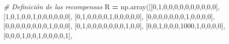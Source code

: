 \documentclass[]{book}
\newenvironment{Shaded}{\begin{snugshade}}{\end{snugshade}}
\newcommand{\CommentTok}[1]{\textcolor[rgb]{0.56,0.35,0.01}{\textit{#1}}}
\newcommand{\DecValTok}[1]{\textcolor[rgb]{0.00,0.00,0.81}{#1}}
\newcommand{\NormalTok}[1]{#1}
\newcommand{\OperatorTok}[1]{\textcolor[rgb]{0.81,0.36,0.00}{\textbf{#1}}}
\begin{document}
\begin{Shaded}
\begin{Highlighting}[]
\CommentTok{# Definición de las recompensas}
\NormalTok{R }\OperatorTok{=}\NormalTok{ np.array([[}\DecValTok{0}\NormalTok{,}\DecValTok{1}\NormalTok{,}\DecValTok{0}\NormalTok{,}\DecValTok{0}\NormalTok{,}\DecValTok{0}\NormalTok{,}\DecValTok{0}\NormalTok{,}\DecValTok{0}\NormalTok{,}\DecValTok{0}\NormalTok{,}\DecValTok{0}\NormalTok{,}\DecValTok{0}\NormalTok{,}\DecValTok{0}\NormalTok{,}\DecValTok{0}\NormalTok{],}
\NormalTok{              [}\DecValTok{1}\NormalTok{,}\DecValTok{0}\NormalTok{,}\DecValTok{1}\NormalTok{,}\DecValTok{0}\NormalTok{,}\DecValTok{0}\NormalTok{,}\DecValTok{1}\NormalTok{,}\DecValTok{0}\NormalTok{,}\DecValTok{0}\NormalTok{,}\DecValTok{0}\NormalTok{,}\DecValTok{0}\NormalTok{,}\DecValTok{0}\NormalTok{,}\DecValTok{0}\NormalTok{],}
\NormalTok{              [}\DecValTok{0}\NormalTok{,}\DecValTok{1}\NormalTok{,}\DecValTok{0}\NormalTok{,}\DecValTok{0}\NormalTok{,}\DecValTok{0}\NormalTok{,}\DecValTok{0}\NormalTok{,}\DecValTok{1}\NormalTok{,}\DecValTok{0}\NormalTok{,}\DecValTok{0}\NormalTok{,}\DecValTok{0}\NormalTok{,}\DecValTok{0}\NormalTok{,}\DecValTok{0}\NormalTok{],}
\NormalTok{              [}\DecValTok{0}\NormalTok{,}\DecValTok{0}\NormalTok{,}\DecValTok{0}\NormalTok{,}\DecValTok{0}\NormalTok{,}\DecValTok{0}\NormalTok{,}\DecValTok{0}\NormalTok{,}\DecValTok{0}\NormalTok{,}\DecValTok{1}\NormalTok{,}\DecValTok{0}\NormalTok{,}\DecValTok{0}\NormalTok{,}\DecValTok{0}\NormalTok{,}\DecValTok{0}\NormalTok{],}
\NormalTok{              [}\DecValTok{0}\NormalTok{,}\DecValTok{0}\NormalTok{,}\DecValTok{0}\NormalTok{,}\DecValTok{0}\NormalTok{,}\DecValTok{0}\NormalTok{,}\DecValTok{0}\NormalTok{,}\DecValTok{0}\NormalTok{,}\DecValTok{0}\NormalTok{,}\DecValTok{1}\NormalTok{,}\DecValTok{0}\NormalTok{,}\DecValTok{0}\NormalTok{,}\DecValTok{0}\NormalTok{],}
\NormalTok{              [}\DecValTok{0}\NormalTok{,}\DecValTok{1}\NormalTok{,}\DecValTok{0}\NormalTok{,}\DecValTok{0}\NormalTok{,}\DecValTok{0}\NormalTok{,}\DecValTok{0}\NormalTok{,}\DecValTok{0}\NormalTok{,}\DecValTok{0}\NormalTok{,}\DecValTok{0}\NormalTok{,}\DecValTok{1}\NormalTok{,}\DecValTok{0}\NormalTok{,}\DecValTok{0}\NormalTok{],}
\NormalTok{              [}\DecValTok{0}\NormalTok{,}\DecValTok{0}\NormalTok{,}\DecValTok{1}\NormalTok{,}\DecValTok{0}\NormalTok{,}\DecValTok{0}\NormalTok{,}\DecValTok{0}\NormalTok{,}\DecValTok{1000}\NormalTok{,}\DecValTok{1}\NormalTok{,}\DecValTok{0}\NormalTok{,}\DecValTok{0}\NormalTok{,}\DecValTok{0}\NormalTok{,}\DecValTok{0}\NormalTok{],}
\NormalTok{              [}\DecValTok{0}\NormalTok{,}\DecValTok{0}\NormalTok{,}\DecValTok{0}\NormalTok{,}\DecValTok{1}\NormalTok{,}\DecValTok{0}\NormalTok{,}\DecValTok{0}\NormalTok{,}\DecValTok{1}\NormalTok{,}\DecValTok{0}\NormalTok{,}\DecValTok{0}\NormalTok{,}\DecValTok{0}\NormalTok{,}\DecValTok{0}\NormalTok{,}\DecValTok{1}\NormalTok{],}

\end{Highlighting}
\end{Shaded}
\end{document}

